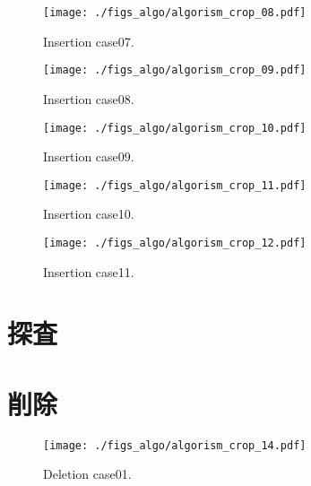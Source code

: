 \begin{figure}[h]
  \vspace{-0.5cm}
  \texttt{[image: ./figs\_algo/algorism\_crop\_08.pdf]}
  \caption{
    Insertion case07.
  }
  \label{fig_IpCHashT_insert_hard_case05}
\end{figure}

\begin{figure}[h]
  \vspace{-0.5cm}
  \texttt{[image: ./figs\_algo/algorism\_crop\_09.pdf]}
  \caption{
    Insertion case08.
  }
  \label{fig_IpCHashT_insert_hard_case07}
  \vspace{-0.5cm}
\end{figure}

\begin{figure}[h]
  \vspace{-0.5cm}
  \texttt{[image: ./figs\_algo/algorism\_crop\_10.pdf]}
  \caption{
    Insertion case09.
  }
  \label{fig_IpCHashT_insert_hard_case09}
  \vspace{-0.5cm}
\end{figure}

\begin{figure}[h]
  \vspace{-0.5cm}
  \texttt{[image: ./figs\_algo/algorism\_crop\_11.pdf]}
  \caption{
    Insertion case10.
  }
  \label{fig_IpCHashT_insert_hard_case08}
  \vspace{-0.5cm}
\end{figure}

\begin{figure}[h]
  \vspace{-0.5cm}
  \texttt{[image: ./figs\_algo/algorism\_crop\_12.pdf]}
  \caption{
    Insertion case11.
  }
  \label{fig_IpCHashT_insert_hard_case10}
  \vspace{-0.5cm}
\end{figure}





\section{探査}


\section{削除}
\begin{figure}[h]
  \vspace{-0.5cm}
  \texttt{[image: ./figs\_algo/algorism\_crop\_14.pdf]}
  \caption{
    Deletion case01.
  }
  \label{fig_IpCHashT_deletion_case01}
  \vspace{-0.5cm}
\end{figure}

